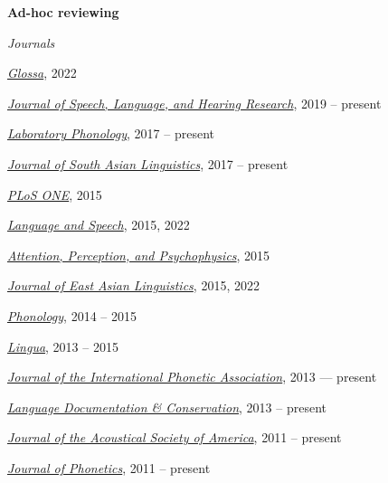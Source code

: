 \documentclass[10pt]{article}
\newcommand{\blankline}{\quad\pagebreak[3]}
\begin{document}
\blankline

\textbf{Ad-hoc reviewing}

\begin{outerlist}

    \item[] \textit{Journals}%

      \begin{innerlist}
      \item
        \href{https://www.glossa-journal.org/}{\emph{Glossa}}, 2022
      \item
        \href{http://www.journal-labphon.org/}{\emph{Journal of Speech, Language, and Hearing Research}}, 2019 -- present
      \item
        \href{http://www.journal-labphon.org/}{\emph{Laboratory Phonology}}, 2017 -- present
      \item
        \href{http://jsal-journal.org/}{\emph{Journal of South Asian Linguistics}}, 2017 -- present
      \item
        \href{http://www.plosone.org/}{\emph{PLoS ONE}}, 2015
      \item
        \href{http://las.sagepub.com}{\emph{Language
            and Speech}}, 2015, 2022
      \item
        \href{http://www.springer.com/psychology/cognitive+psychology/journal/13414}{\emph{Attention,
            Perception, and Psychophysics}}, 2015
      \item
        \href{http://link.springer.com/journal/10831}{\emph{Journal of East Asian Linguistics}},
        2015, 2022
      \item
        \href{http://journals.cambridge.org/action/displayJournal?jid=PHO}{\emph{Phonology}},
        2014 -- 2015
      \item \href{http://www.journals.elsevier.com/lingua/}{\emph{Lingua}}, 2013 -- 2015
        \item
          \href{http://journals.cambridge.org/action/displayJournal?jid=IPA}{\emph{Journal
              of the International Phonetic Association}}, 2013 --- present
        \item \href{http://nflrc.hawaii.edu/ldc/}{\emph{Language Documentation \& Conservation}}, 2013 -- present
        \item \href{http://asadl.org/jasa/}{\emph{Journal of the Acoustical Society of America}}, 2011 -- present
        \item \href{http://www.journals.elsevier.com/journal-of-phonetics/}{\emph{Journal of Phonetics}}, 2011 -- present
      \end{innerlist}


\end{outerlist}
\end{document}
